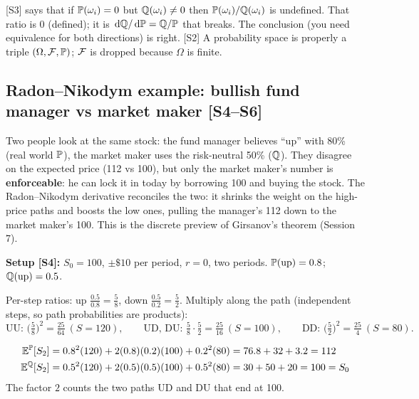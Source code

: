 \documentclass[10pt]{article}
\begin{document}
\begin{exam}
\flag{} [S3] says that if $\mathbb{P}(\omega_i)=0$ but $\mathbb{Q}(\omega_i)\ne0$ then $\mathbb{P}(\omega_i)/\mathbb{Q}(\omega_i)$ is undefined. That ratio is $0$ (defined); it is $\,\mathrm{d}\mathbb{Q}/\,\mathrm{d}\mathbb{P}=\mathbb{Q}/\mathbb{P}$ that breaks. The conclusion (you need equivalence for both directions) is right. \flag{} [S2] A probability space is properly a triple $(\Omega,\mathcal{F},\mathbb{P})$; $\mathcal{F}$ is dropped because $\Omega$ is finite.
\end{exam}

\subsection{Radon--Nikodym example: bullish fund manager vs market maker [S4--S6]}
\begin{idea}
Two people look at the same stock: the fund manager believes ``up'' with 80\% (real world $\mathbb{P}$), the market maker uses the risk-neutral 50\% ($\mathbb{Q}$). They disagree on the expected price (112 vs 100), but only the market maker's number is \textbf{enforceable}: he can lock it in today by borrowing 100 and buying the stock. The Radon--Nikodym derivative reconciles the two: it shrinks the weight on the high-price paths and boosts the low ones, pulling the manager's 112 down to the market maker's 100. This is the discrete preview of Girsanov's theorem (Session 7).
\end{idea}
\textbf{Setup [S4]:} $S_0=100$, $\pm\$10$ per period, $r=0$, two periods. $\mathbb{P}(\text{up})=0.8$; $\mathbb{Q}(\text{up})=0.5$.
\begin{deriv}
Per-step ratios: up $\frac{0.5}{0.8}=\frac58$, down $\frac{0.5}{0.2}=\frac52$. Multiply along the path (independent steps, so path probabilities are products):
\[\text{UU: }\Big(\tfrac58\Big)^2=\tfrac{25}{64}\ (S=120),\qquad \text{UD, DU: }\tfrac58\cdot\tfrac52=\tfrac{25}{16}\ (S=100),\qquad \text{DD: }\Big(\tfrac52\Big)^2=\tfrac{25}{4}\ (S=80).\]
\end{deriv}
\begin{deriv}
\vspace{-6pt}
\begin{align*}
\mathbb{E}^{\mathbb{P}}[S_2]&=0.8^2(120)+2(0.8)(0.2)(100)+0.2^2(80)=76.8+32+3.2=112\\
\mathbb{E}^{\mathbb{Q}}[S_2]&=0.5^2(120)+2(0.5)(0.5)(100)+0.5^2(80)=30+50+20=100=S_0
\end{align*}
The factor $2$ counts the two paths UD and DU that end at 100.
\end{deriv}
\end{document}
